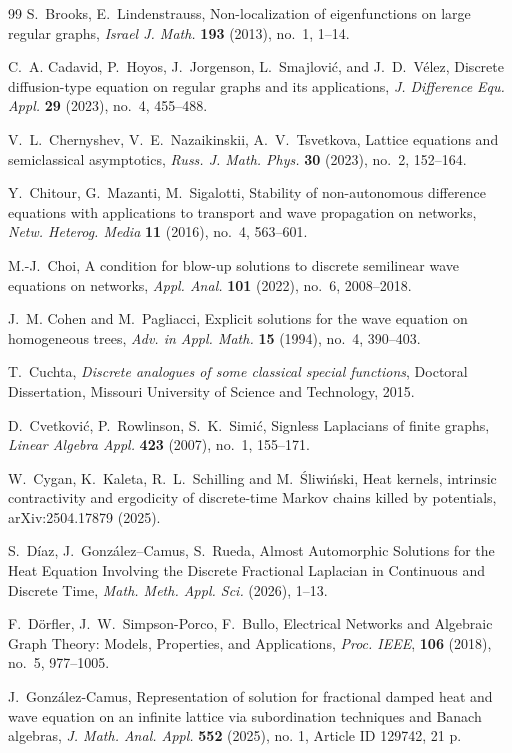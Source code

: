 \documentclass[12pt]{amsart}
\numberwithin{equation}{section}
\theoremstyle{boldremark}
\begin{document}
\begin{thebibliography}{99}
 S.~Brooks, E.~Lindenstrauss, Non-localization of eigenfunctions on large regular graphs, \emph{Israel J. Math.} \textbf{193} (2013), no.~1, 1--14.

 C.~A. Cadavid, P.~Hoyos, J.~Jorgenson, L.~Smajlovi\'{c}, and J.~D.~V\'{e}lez, Discrete diffusion-type equation on regular graphs
and its applications, \emph{J. Difference Equ. Appl.} \textbf{29} (2023), no.~4, 455--488.

 V.~L.~Chernyshev, V.~E.~Nazaikinskii, A.~V.~Tsvetkova, Lattice equations and semiclassical asymptotics, \emph{Russ. J. Math. Phys.} \textbf{30} (2023), no.~2, 152--164.

 Y.~Chitour, G.~Mazanti, M.~Sigalotti, Stability of non-autonomous difference equations with applications to transport and wave propagation on networks, \emph{Netw. Heterog. Media} \textbf{11} (2016), no.~4, 563--601.

 M.-J.~Choi, A condition for blow-up solutions to discrete semilinear wave equations on networks, \emph{Appl. Anal.} \textbf{101} (2022), no.~6, 2008--2018.

 J.~M. Cohen and M.~Pagliacci, Explicit solutions for the wave equation on homogeneous trees, \emph{Adv. in Appl. Math.} \textbf{15} (1994), no.~4, 390--403.

 T.~Cuchta, \emph{Discrete analogues of some classical special functions}, Doctoral Dissertation, Missouri University of Science and Technology, 2015.

 D.~Cvetkovi\'{c}, P.~Rowlinson, S.~K.~Simi\'{c}, Signless Laplacians of finite graphs, \emph{Linear Algebra Appl.} \textbf{423} (2007), no.~1, 155--171.

 W.~Cygan, K.~Kaleta, R.~L.~Schilling and M.~Śliwiński, Heat kernels, intrinsic contractivity and ergodicity of discrete-time Markov chains killed by potentials, arXiv:2504.17879 (2025).

 S.~D\'iaz, J.~Gonz\'alez--Camus, S.~Rueda, Almost Automorphic Solutions for the Heat Equation Involving the Discrete Fractional Laplacian in Continuous and Discrete Time,  \emph{Math. Meth. Appl. Sci.} (2026), 1--13.

 F.~D\"orfler, J.~W.~Simpson-Porco, F.~Bullo, Electrical Networks and Algebraic Graph Theory: Models, Properties, and Applications, \emph{Proc. IEEE}, \textbf{106} (2018), no.~5, 977--1005.

 J.~Gonz\'alez-Camus, Representation of solution for fractional damped heat and wave equation on an infinite lattice via subordination techniques and Banach algebras,
\emph{J. Math. Anal. Appl.} \textbf{552} (2025), no. 1, Article ID 129742, 21 p.


\end{thebibliography}
\end{document}
